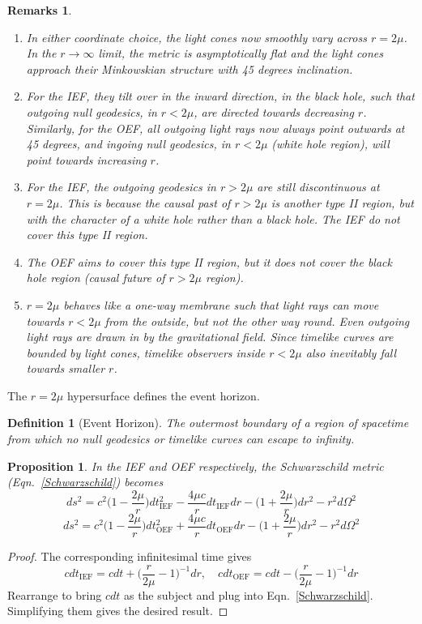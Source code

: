 \documentclass[a4paper]{article}
\newtheorem{remarks}{Remarks}[section]
\theoremstyle{new}
\newtheorem{defi}{Definition}[section]
\newtheorem{prop}{Proposition}[section]
\begin{document}
\newpage
\begin{remarks}\leavevmode
\begin{enumerate}
    \item In either coordinate choice, the light cones now smoothly vary across $r=2\mu$. In the $r\rightarrow\infty$ limit, the metric is asymptotically flat and the light cones approach their Minkowskian structure with 45 degrees inclination.
    \item For the IEF, they tilt over in the inward direction, in the black hole, such that outgoing null geodesics, in $r<2\mu$, are directed towards decreasing $r$. Similarly, for the OEF, all outgoing light rays now always point outwards at 45 degrees, and ingoing null geodesics, in $r<2\mu$ (white hole region), will point towards increasing $r$.
    \item For the IEF, the outgoing geodesics in $r>2\mu$ are still discontinuous at $r=2\mu$. This is because the causal past of $r>2\mu$ is another type II region, but with the character of a white hole rather than a black hole. The IEF do not cover this type II region.
    \item The OEF aims to cover this type II region, but it does not cover the black hole region (causal future of $r>2\mu$ region).
    \item $r=2\mu$ behaves like a one-way membrane such that light rays can move towards $r<2\mu$ from the outside, but not the other way round. Even outgoing light rays are drawn in by the gravitational field. Since timelike curves are bounded by light cones, timelike observers inside $r<2\mu$ also inevitably fall towards smaller $r$.
\end{enumerate}
\end{remarks}
The $r=2\mu$ hypersurface defines the event horizon.
\begin{defi}[Event Horizon]
The outermost boundary of a region of spacetime from which no null geodesics or timelike curves can escape to infinity.
\end{defi}
\begin{prop}
In the IEF and OEF respectively, the Schwarzschild metric (Eqn.~\ref{Schwarzschild}) becomes
$$ds^2=c^2\bigg(1-\frac{2\mu}{r}\bigg)dt_{\text{IEF}}^2-\frac{4\mu c}{r}dt_{\text{IEF}}dr-\bigg(1+\frac{2\mu}{r}\bigg)dr^2-r^2d\Omega^2$$
$$ds^2=c^2\bigg(1-\frac{2\mu}{r}\bigg)dt_{\text{OEF}}^2+\frac{4\mu c}{r}dt_{\text{OEF}}dr-\bigg(1+\frac{2\mu}{r}\bigg)dr^2-r^2d\Omega^2$$
\end{prop}
\begin{proof}
The corresponding infinitesimal time gives
$$cdt_{\text{IEF}}=cdt+\bigg(\frac{r}{2\mu}-1\bigg)^{-1}dr,\quad cdt_{\text{OEF}}=cdt-\bigg(\frac{r}{2\mu}-1\bigg)^{-1}dr$$
Rearrange to bring $cdt$ as the subject and plug into Eqn.~\ref{Schwarzschild}. Simplifying them gives the desired result.
\end{proof}
\end{document}
